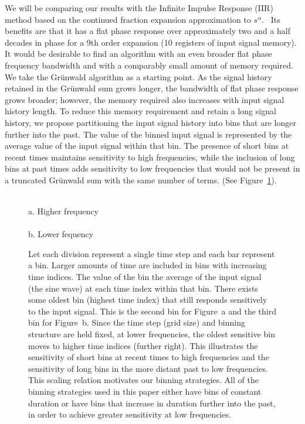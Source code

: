 We will be comparing our results with the Infinite Impulse Response (IIR) method 
based on the continued fraction expansion approximation to
$s^\alpha$.~\cite{Chen:04a} Its benefits are that it has a flat phase response over
approximately two and a half decades in phase for a 9th order
expansion (10 registers of input signal memory). It would be desirable
to find an algorithm with an even broader flat phase frequency
bandwidth and with a comparably small amount of memory required. We
take the Gr{\"u}nwald algorithm as a starting point. As the signal history
retained in the Gr{\"u}nwald sum grows longer, the bandwidth of flat phase
response grows broader; however, the memory required also increases
with input signal history length. To reduce this memory requirement
and retain a long signal history, we propose partitioning the input
signal history into bins that are longer further into the past. The
value of the binned input signal is represented by the average value
of the input signal within that bin. The presence of short bins at
recent times maintains sensitivity to high frequencies, while the 
inclusion of long bins at past times adds sensitivity to low frequencies 
that would not be present in a truncated Gr{\"u}nwald 
sum with the same number of terms. (See Figure~\ref{fig:freqScaling}).


\begin{figure}
\centering
{}
\\a. Higher frequency\\
\\b. Lower fequency
\caption{Let each division represent a single time step and each bar represent a bin. Larger amounts of time are included in bins with increasing time indices. The value of the bin the average of the input signal (the sine wave) at each time index within that bin. There exists some oldest bin (highest time index) that still responds sensitively to the input signal. This is the second bin for Figure~a and the third bin for Figure~b. Since the time step (grid size) and binning structure are held fixed, at lower frequencies, the oldest sensitive bin moves to higher time indices (further right). This illustrates the sensitivity of short bins at recent times to high frequencies and the sensitivity of long bins in the  more distant past to low frequencies. This scaling relation motivates our binning strategies. All of the binning strategies used in this paper either have bins of constant duration or have bins that increase in duration further into the past, in order to achieve greater sensitivity at low frequencies.}
\label{fig:freqScaling}
\end{figure}

